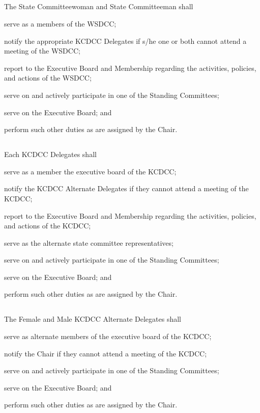 \subsection{}
The State Committeewoman and State Committeeman shall
\begin{inlinealphalist}
    \item serve as a members of the WSDCC;
    \item notify the appropriate KCDCC Delegates if s/he one or both cannot attend a meeting of the WSDCC;
    \item report to the Executive Board and Membership regarding the activities, policies, and actions of the WSDCC;
    \item serve on and actively participate in one of the Standing Committees;
    \item serve on the Executive Board; and
    \item perform such other duties as are assigned by the Chair.
\end{inlinealphalist}

\subsection{}
Each KCDCC Delegates shall
\begin{inlinealphalist}
    \item serve as a member the executive board of the KCDCC;
    \item notify the KCDCC Alternate Delegates if they cannot attend a meeting of the KCDCC;
    \item report to the Executive Board and Membership regarding the activities, policies, and actions of the KCDCC;
    \item serve as the alternate state committee representatives;
    \item serve on and actively participate in one of the Standing Committees;
    \item serve on the Executive Board; and
    \item perform such other duties as are assigned by the Chair.
\end{inlinealphalist}

\subsection{}
The Female and Male KCDCC Alternate Delegates shall
\begin{inlinealphalist}
    \item serve as alternate members of the executive board of the KCDCC;
    \item notify the Chair if they cannot attend a meeting of the KCDCC;
    \item serve on and actively participate in one of the Standing Committees;
    \item serve on the Executive Board; and
    \item perform such other duties as are assigned by the Chair.
\end{inlinealphalist}

